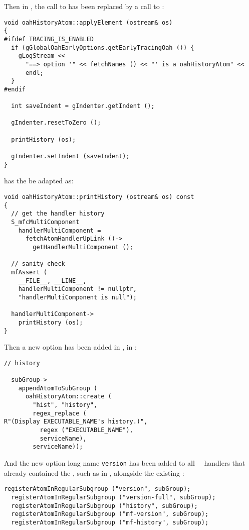 Then in , the call to  has been replaced by a call to :
\begin{lstlisting}[language=CPlusPlus]
void oahHistoryAtom::applyElement (ostream& os)
{
#ifdef TRACING_IS_ENABLED
  if (gGlobalOahEarlyOptions.getEarlyTracingOah ()) {
    gLogStream <<
      "==> option '" << fetchNames () << "' is a oahHistoryAtom" <<
      endl;
  }
#endif

  int saveIndent = gIndenter.getIndent ();

  gIndenter.resetToZero ();

  printHistory (os);

  gIndenter.setIndent (saveIndent);
}
\end{lstlisting}

\method{}{} has the be adapted as:
\begin{lstlisting}[language=CPlusPlus]
void oahHistoryAtom::printHistory (ostream& os) const
{
  // get the handler history
  S_mfcMultiComponent
    handlerMultiComponent =
      fetchAtomHandlerUpLink ()->
        getHandlerMultiComponent ();

  // sanity check
  mfAssert (
    __FILE__, __LINE__,
    handlerMultiComponent != nullptr,
    "handlerMultiComponent is null");

  handlerMultiComponent->
    printHistory (os);
}
\end{lstlisting}

Then a new option has been added in , in :
\begin{lstlisting}[language=CPlusPlus]
  // history

  subGroup->
    appendAtomToSubGroup (
      oahHistoryAtom::create (
        "hist", "history",
        regex_replace (
R"(Display EXECUTABLE_NAME's history.)",
          regex ("EXECUTABLE_NAME"),
          serviceName),
        serviceName));
\end{lstlisting}

And the new option long name {\tt version} has been added to all \regular\ \oahRepr\ handlers that already contained the , such as in , alongside the existing :
\begin{lstlisting}[language=CPlusPlus]
  registerAtomInRegularSubgroup ("version", subGroup);
  registerAtomInRegularSubgroup ("version-full", subGroup);
  registerAtomInRegularSubgroup ("history", subGroup);
  registerAtomInRegularSubgroup ("mf-version", subGroup);
  registerAtomInRegularSubgroup ("mf-history", subGroup);
\end{lstlisting}


